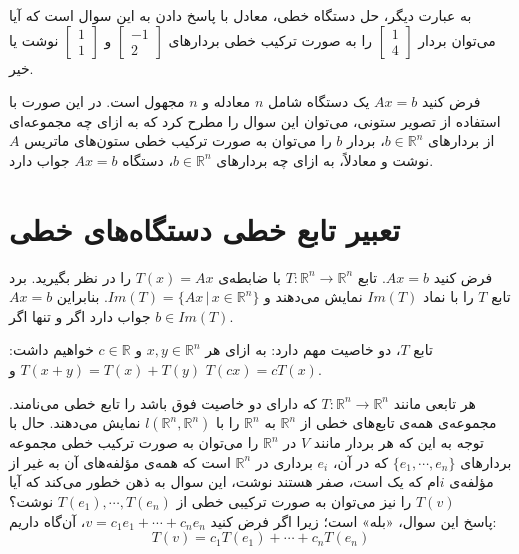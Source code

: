 \begin{enumerate}
به عبارت دیگر، حل دستگاه خطی، معادل با پاسخ دادن به این سوال است که آیا می‌توان بردار  $\begin{bmatrix}
1\\
4
\end{bmatrix}$ 	 را به صورت ترکیب خطی بردار‌های 	$\begin{bmatrix}
-1\\
2
\end{bmatrix}$ 	و 	$\begin{bmatrix}
1\\
1
\end{bmatrix}$ 	 نوشت یا خیر.

فرض کنید $Ax = b$ یک دستگاه شامل $n$ معادله و $n$ مجهول است. در این صورت با استفاده از تصویر ستونی، می‌توان این سوال را مطرح کرد که به ازای چه مجموعه‌ای از بردار‌های $b\in \mathbb{R}^n$،  بردار $b$ را می‌توان به صورت ترکیب خطی ستون‌های ماتریس $A$ نوشت و معادلاً، به ازای چه بردار‌های $b\in \mathbb{R}^n$، دستگاه $Ax=b$ جواب دارد.
\end{enumerate}
\pagebreak
\section{تعبیر تابع خطی دستگاه‌های خطی}
\begin{remark}
فرض کنید $Ax=b$. تابع $T: \mathbb{R}^n \xrightarrow{} \mathbb{R}^n$ با ضابطه‌ی $T(x) = Ax$ را در نظر بگیرید. برد تابع $T$ را با نماد $Im(T)$ نمایش می‌دهند و $Im(T) = \{Ax\,|\,x \in \mathbb{R}^n\}$. بنابراین $Ax=b$ جواب دارد اگر و تنها اگر $b \in Im(T)$.
\end{remark}

\begin{remark}
تابع $T$، دو خاصیت مهم دارد: به ازای هر $x,y \in \mathbb{R}^n$ و $c \in \mathbb{R}$ خواهیم داشت: $T(x+y) = T(x)+T(y)$ و $T(cx) = cT(x)$.
\end{remark}

هر تابعی مانند $T: \mathbb{R}^n \xrightarrow{} \mathbb{R}^n$ که دارای دو خاصیت فوق باشد را تابع خطی می‌نامند. مجموعه‌ی همه‌ی تابع‌های خطی از $\mathbb{R}^n$ به $\mathbb{R}^n$ را با $l(\mathbb{R}^n,\mathbb{R}^n)$ نمایش می‌دهند. حال با توجه به این که هر بردار مانند $V$ در $\mathbb{R}^n$ را می‌توان به صورت ترکیب خطی مجموعه بردار‌های $\{e_{1},\cdots,e_{n}\}$ که در آن، $e_{i}$ برداری در $\mathbb{R}^{n}$ است که همه‌ی مؤلفه‌های آن به غیر از مؤلفه‌ی $i$ام که یک است، صفر‌ هستند نوشت، این سوال به ذهن خطور می‌کند که آیا $T(v)$ را نیز می‌توان به صورت ترکیبی خطی از $T(e_{1}),\cdots,T(e_{n})$ نوشت؟\\
پاسخ این سوال، «بله» است؛ زیرا اگر فرض کنید $v = c_{1}e_{1} + \cdots + c_{n}e_{n}$، آن‌گاه داریم:
\begin{equation}
T(v) = c_{1}T(e_{1})+\cdots+c_{n}T(e_{n})
\end{equation}

